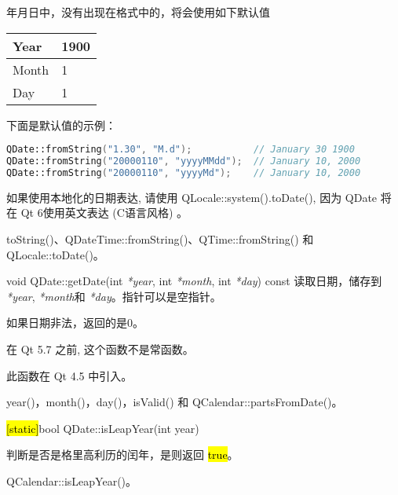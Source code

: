 年月日中，没有出现在格式中的，将会使用如下默认值

\begin{tabular}{|l|l|}
\hline
Year&	1900\\
\hline
Month&	1\\
\hline
Day&	1\\
\hline
\end{tabular}

下面是默认值的示例：

\begin{lstlisting}[language=C++]
QDate::fromString("1.30", "M.d");           // January 30 1900
QDate::fromString("20000110", "yyyyMMdd");  // January 10, 2000
QDate::fromString("20000110", "yyyyMd");    // January 10, 2000
\end{lstlisting}



\begin{notice}
如果使用本地化的日期表达, 请使用 QLocale::system().toDate(), 因为 QDate 将在 Qt 6使用英文表达 (C语言风格) 。
	
\end{notice}


\begin{notice}[另请参阅]
toString()、QDateTime::fromString()、QTime::fromString() 和 QLocale::toDate()。
\end{notice}


\splitLine

void QDate::getDate(int  \emph{*year}, int \emph{*month}, int \emph{*day}) const
读取日期，储存到 \emph{*year},  \emph{*month}和 \emph{*day}。指针可以是空指针。

如果日期非法，返回的是0。



\begin{notice}
 在 Qt 5.7 之前, 这个函数不是常函数。
\end{notice}

此函数在 Qt 4.5 中引入。



\begin{notice}[另请参阅]
year()，month()，day()，isValid() 和
QCalendar::partsFromDate()。
\end{notice}

\splitLine

\hl{[static]}bool QDate::isLeapYear(int year)

判断是否是格里高利历的闰年，是则返回 \hl{true}。


\begin{notice}[另请参阅]
QCalendar::isLeapYear()。
\end{notice}


